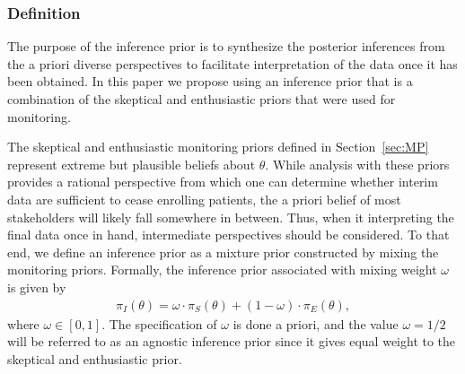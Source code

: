 \documentclass[12pt]{article}
\begin{document}
\subsubsection{Definition}
The purpose of the inference prior is to synthesize the posterior inferences from the a priori diverse perspectives to facilitate interpretation of the data once it has been obtained. In this paper we propose using an inference prior that is a combination of the skeptical and enthusiastic priors that were used for monitoring.

The skeptical and enthusiastic monitoring priors defined in Section~\ref{sec:MP} represent extreme but plausible beliefs about $\theta$.
%
While analysis with these priors provides a rational perspective from which one can determine whether interim data are sufficient 
to cease enrolling patients, the a priori belief of most stakeholders will likely fall somewhere in between.
%
Thus, when it interpreting the final data once in hand, intermediate perspectives should be considered.
%
To that end, we define an inference prior as a mixture prior constructed by mixing the monitoring priors.
%
Formally, the inference prior associated with mixing weight $\omega$ is given by
\begin{align}\label{eq:inference_prior}
\pi_{I}\left(\theta\right)=\omega\cdot\pi_{S}\left(\theta\right)+(1-\omega) \cdot \pi_E\left(\theta\right),
\end{align}
where $\omega\in[0,1]$. 
%
The specification of $\omega$ is done a priori, and the value $\omega=1/2$ will be referred to as an agnostic inference prior since it gives equal weight to the skeptical and enthusiastic prior.
%
\end{document}
